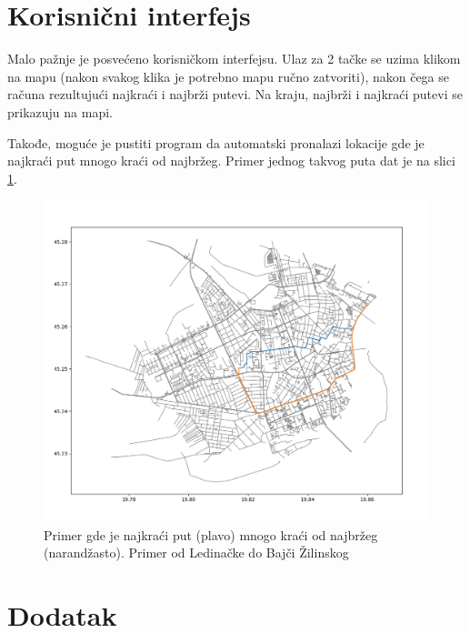 \documentclass[a4paper]{article}
\begin{document}
\section{Korisnični interfejs}

Malo pažnje je posvećeno korisničkom interfejsu. Ulaz za 2 tačke se uzima klikom na mapu (nakon svakog klika je potrebno mapu ručno zatvoriti), nakon čega se računa rezultujući najkraći i najbrži putevi. Na kraju, najbrži i najkraći putevi se prikazuju na mapi.

Takođe, moguće je pustiti program da automatski pronalazi lokacije gde je najkraći put mnogo kraći od najbržeg. Primer jednog takvog puta dat je na slici \ref{fig:shortest_fastest}.

\begin{figure}
    \centering
    \includegraphics[width=\linewidth]{najkracem_je_najduzi.png}
    \caption{Primer gde je najkraći put (plavo) mnogo kraći od najbržeg (narandžasto). Primer od Ledinačke do Bajči Žilinskog}
    \label{fig:shortest_fastest}
\end{figure}

\section{Dodatak}
\end{document}
